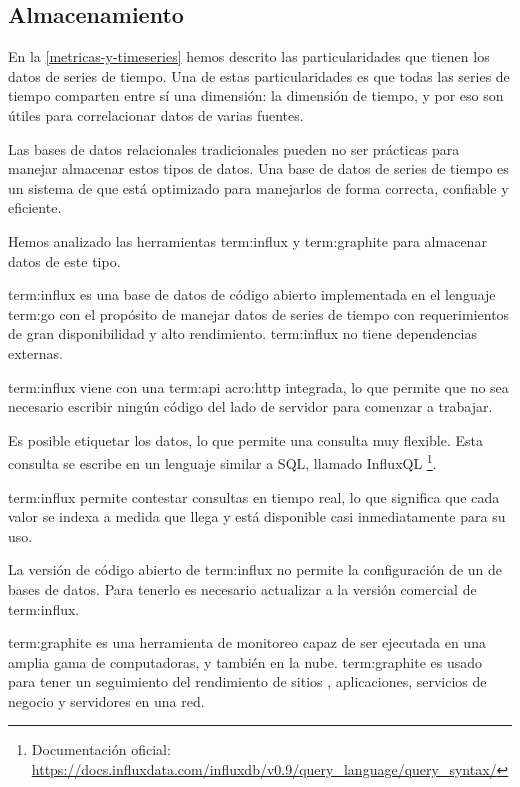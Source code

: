 \subsection{Almacenamiento}
\label{almacenamiento}

En la \autoref{metricas-y-timeseries} hemos descrito las particularidades que
tienen los datos de series de tiempo. Una de estas particularidades es que
todas las series de tiempo comparten entre sí una dimensión: la dimensión de
tiempo, y por eso son útiles para correlacionar datos de varias fuentes.

Las bases de datos relacionales tradicionales pueden no ser prácticas para
manejar almacenar estos tipos de datos. Una base de datos de series de tiempo
es un sistema de  que está optimizado para manejarlos de forma
correcta, confiable y eficiente.

Hemos analizado las herramientas \gls{term:influx} y \gls{term:graphite} para
almacenar datos de este tipo.

\gls{term:influx} es una base de datos de código abierto implementada en el
lenguaje \gls{term:go} con el propósito de manejar datos de series de tiempo
con requerimientos de gran disponibilidad y alto rendimiento. \gls{term:influx}
no tiene dependencias externas.

\gls{term:influx} viene con una \gls{term:api} \gls{acro:http} integrada, lo
que permite que no sea necesario escribir ningún código del lado de servidor
para comenzar a trabajar. \cite{influxdb}

Es posible etiquetar los datos, lo que permite una consulta muy flexible. Esta
consulta se escribe en un lenguaje similar a SQL, llamado InfluxQL
\footnote{Documentación oficial: \url{https://docs.influxdata.com/influxdb/v0.9/query_language/query_syntax/}}.

\gls{term:influx} permite contestar consultas en tiempo real, lo que significa
que cada valor se indexa a medida que llega y está disponible casi
inmediatamente para su uso.

La versión de código abierto de \gls{term:influx} no permite la configuración de
un  de bases de datos. Para tenerlo es necesario actualizar a la
versión comercial de \gls{term:influx}.

\gls{term:graphite} es una herramienta de monitoreo capaz de ser ejecutada en
una amplia gama de computadoras, y también en la nube. \gls{term:graphite} es
usado para tener un seguimiento del rendimiento de sitios ,
aplicaciones, servicios de negocio y servidores en una red.

